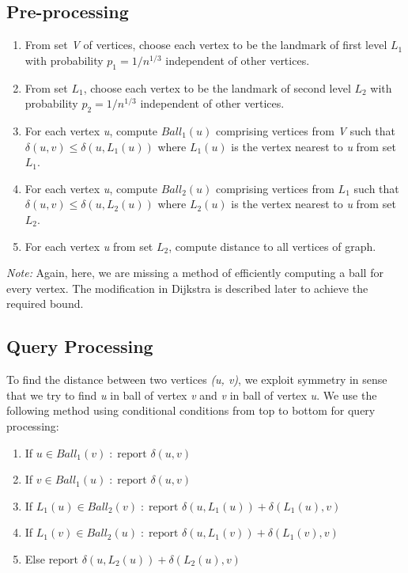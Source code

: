 \documentclass{article}
\begin{document}
\subsection{Pre-processing}
\begin{enumerate}
    \item From set \textit{V} of vertices, choose each vertex to be the landmark of first level \(L_1\) with probability \(p_1 = 1/n^{1/3}\) independent of other vertices.
    \item From set \(L_1\), choose each vertex to be the landmark of second level \(L_2\) with probability \(p_2 = 1/n^{1/3}\) independent of other vertices.
    \item For each vertex \textit{u}, compute \(Ball_1(u)\) comprising vertices from \textit{V} such that \(\delta(u, v) \leq \delta(u, L_1(u))\) where \(L_1(u)\) is the vertex nearest to \textit{u} from set \(L_1\). 
    \item For each vertex \textit{u}, compute \(Ball_2(u)\) comprising vertices from \(L_1\) such that \(\delta(u, v) \leq \delta(u, L_2(u))\) where \(L_2(u)\) is the vertex nearest to \textit{u} from set \(L_2\).
    \item For each vertex \textit{u} from set \(L_2\), compute distance to all vertices of graph.  
\end{enumerate}

\noindent \textit{Note:} Again, here, we are missing a method of efficiently computing a ball for every vertex. The modification in Dijkstra is described later to achieve the required bound.

\subsection{Query Processing}
To find the distance between two vertices \textit{(u, v)}, we exploit symmetry in sense that we try to find \textit{u} in ball of vertex \textit{v} and \textit{v} in ball of vertex \textit{u}. We use the following method using conditional conditions from top to bottom for query processing: 
\begin{enumerate}
    \item If \(u \in Ball_1(v) \; : \; \text{report } \delta(u, v)\)
    \item If \(v \in Ball_1(u) \; : \; \text{report } \delta(u, v)\)
    \item If \(L_1(u) \in Ball_2(v) \; : \; \text{report } \delta(u, L_1(u)) + \delta(L_1(u), v)\)
    \item If \(L_1(v) \in Ball_2(u) \; : \; \text{report } \delta(u, L_1(v)) + \delta(L_1(v), v)\)
    \item Else \(\text{report } \delta(u, L_2(u)) + \delta(L_2(u), v)\)
\end{enumerate}
\end{document}
